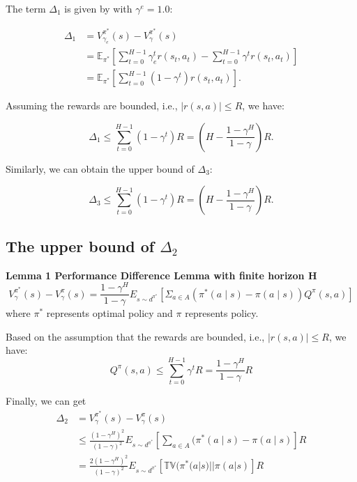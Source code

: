 The term $\Delta_1$ is given by with $\gamma^e=1.0$:

\[
\begin{aligned}
\Delta_1 &= V_{\gamma_e}^{\pi^{*}}(s) - V_{\gamma}^{\pi^{*}}(s) \\
&= \mathbb{E}_{\pi^*} \left[ \sum_{t=0}^{H-1} \gamma_e^t r(s_t, a_t) - \sum_{t=0}^{H-1} \gamma^t r(s_t, a_t) \right] \\
&= \mathbb{E}_{\pi^*} \left[ \sum_{t=0}^{H-1} (1 - \gamma^t) r(s_t, a_t) \right].
\end{aligned}
\]

Assuming the rewards are bounded, i.e., $|r(s, a)| \leq R$, we have:

\begin{equation}
    \Delta_1 \leq \sum_{t=0}^{H-1} (1 - \gamma^t)R=(H - \frac{1-\gamma^H}{1-\gamma}) R.
\end{equation}


Similarly, we can obtain the upper bound of $\Delta_3$:

\begin{equation}
    \Delta_3 \leq \sum_{t=0}^{H-1} (1 - \gamma^t)R=(H - \frac{1-\gamma^H}{1-\gamma}) R.
\end{equation}

\subsection{The upper bound of $\Delta_2$}
\textbf{Lemma 1 Performance Difference Lemma with finite horizon H~\citep{kakade2002appro}} 
\begin{equation}
V^{\pi^{*}}_{\gamma}(s)-V^\pi_{\gamma}(s)=\frac{1-\gamma^H}{1-\gamma} E_{s \sim d^{\pi^{*}}}\left[\Sigma_{a \in A}(\pi^{*}(a \mid s)-\pi(a \mid s)) Q^\pi(s, a)\right]
\end{equation}
where $\pi^*$ represents optimal policy and $\pi$ represents policy.

Based on the assumption that the rewards are bounded, i.e., $|r(s, a)| \leq R$, we have:
\begin{equation}
Q^\pi(s, a) \leq \sum_{t=0}^{H-1}\gamma^t R = \frac{1-\gamma^H}{1-\gamma}R
\end{equation}

Finally, we can get
\begin{align}
    \Delta_2 &= V^{\pi^{*}}_{\gamma}(s)-V^\pi_{\gamma}(s) \\
    &\leq \frac{(1-\gamma^H)^2}{(1-\gamma)^2}E_{s \sim d^{\pi^{*}}}\left[\sum_{a \in A}(\pi^*(a \mid s)-\pi(a \mid s)\right] R \\
    &= \frac{2(1-\gamma^H)^2}{(1-\gamma)^2}E_{s \sim d^{\pi^{*}}}\left[\mathbb{TV}(\pi^{*}(a|s)||\pi(a|s)\right]R
\end{align}

